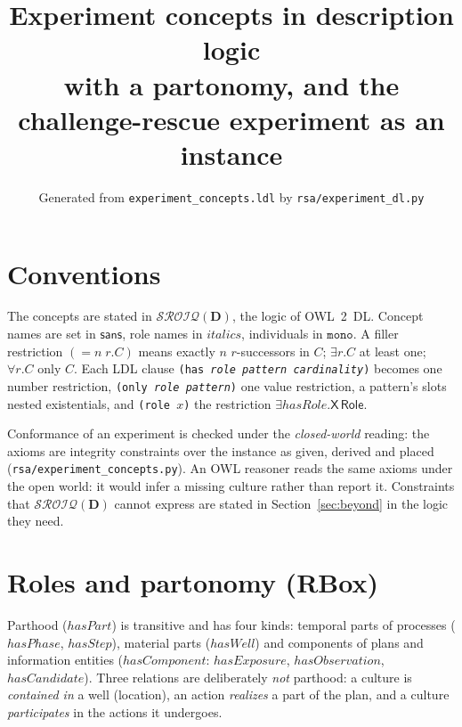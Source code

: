 \documentclass[10pt,a4paper]{article}
\title{Experiment concepts in description logic\\[2pt]\large with a partonomy, and the challenge-rescue experiment as an instance}
\author{Generated from \texttt{experiment\_concepts.ldl} by \texttt{rsa/experiment\_dl.py}}
\date{}
\begin{document}
\maketitle
\section*{Conventions}
The concepts are stated in $\mathcal{SROIQ}(\mathbf{D})$, the logic of OWL~2~DL. Concept names are set in
$\mathsf{sans}$, role names in $\mathit{italics}$, individuals in $\mathtt{mono}$. A filler restriction
$(=\!n\;r.C)$ means exactly $n$ $r$-successors in $C$; $\exists r.C$ at least one; $\forall r.C$ only $C$.
Each LDL clause \texttt{(has \emph{role pattern cardinality})} becomes one number restriction,
\texttt{(only \emph{role pattern})} one value restriction, a pattern's slots nested existentials, and
\texttt{(role $x$)} the restriction $\exists\mathit{hasRole}.\mathsf{X\,Role}$.

Conformance of an experiment is checked under the \emph{closed-world} reading: the axioms are integrity
constraints over the instance as given, derived and placed (\texttt{rsa/experiment\_concepts.py}). An OWL reasoner
reads the same axioms under the open world: it would infer a missing culture rather than report it. Constraints that
$\mathcal{SROIQ}(\mathbf{D})$ cannot express are stated in Section~\ref{sec:beyond} in the logic they need.

\section{Roles and partonomy (RBox)}
Parthood ($\mathit{hasPart}$) is transitive and has four kinds: temporal parts of processes ($\mathit{hasPhase}$,
$\mathit{hasStep}$), material parts ($\mathit{hasWell}$) and components of plans and information entities
($\mathit{hasComponent}$: $\mathit{hasExposure}$, $\mathit{hasObservation}$, $\mathit{hasCandidate}$). Three relations
are deliberately \emph{not} parthood: a culture is \emph{contained in} a well (location), an action \emph{realizes} a
part of the plan, and a culture \emph{participates} in the actions it undergoes.
\end{document}
